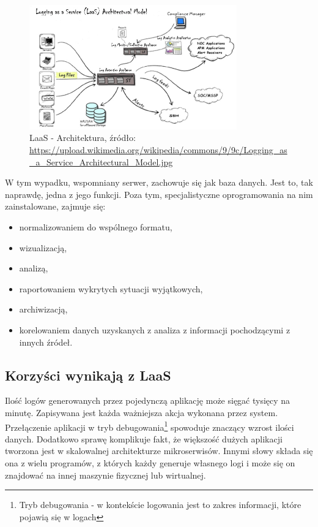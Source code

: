     \begin{figure}[H]
        \centering
        \includegraphics[width=0.80\textwidth]{images/Logging_as_a_Service_Architectural_Model}
        \caption[LaaS - Architektura]{
            LaaS - Architektura, źródło: \url{https://upload.wikimedia.org/wikipedia/commons/9/9c/Logging_as_a_Service_Architectural_Model.jpg}
        }
        \label{chapter:monitoring_architecture:laas:architecture_image}
    \end{figure}
    
    W tym wypadku, wspomniany serwer, zachowuje się
    jak baza danych. Jest to, tak naprawdę, jedna z jego funkcji. Poza tym, specjalistyczne oprogramowania na nim zainstalowane, zajmuje się:
    \begin{itemize}
        \item normalizowaniem do wspólnego formatu,
        \item wizualizacją,
        \item analizą,
        \item raportowaniem wykrytych sytuacji wyjątkowych,
        \item archiwizacją,
        \item korelowaniem danych uzyskanych z analiza z informacji pochodzącymi z innych źródeł.
    \end{itemize} \cite{laas_wikipedia}
    
    \subsection{Korzyści wynikają z LaaS}
    Ilość logów generowanych przez pojedynczą aplikację może sięgać tysięcy na minutę.
    Zapisywana jest każda ważniejsza akcja wykonana przez system. Przełączenie aplikacji
    w tryb debugowania\footnote{Tryb debugowania - w kontekście logowania jest to zakres informacji,
        które pojawią się w logach} spowoduje znaczący wzrost ilości danych.
    Dodatkowo sprawę komplikuje fakt, że większość dużych aplikacji tworzona jest w skalowalnej architekturze
    mikroserwisów. Innymi słowy składa się ona z wielu programów, z których każdy generuje własnego logi i
    może się on znajdować na innej maszynie fizycznej lub wirtualnej.
    
